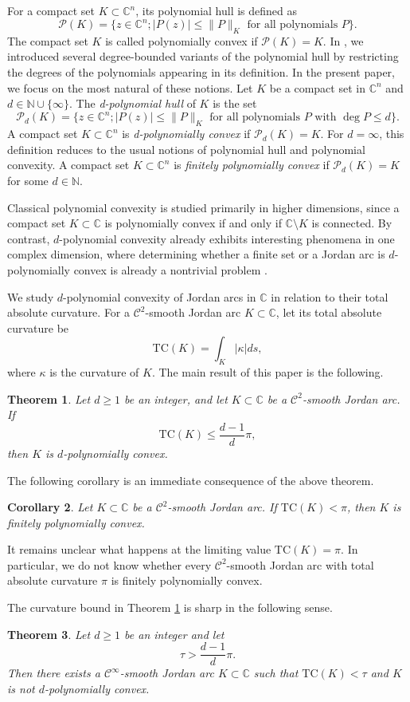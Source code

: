 \documentclass[reqno]{amsart}
\newtheorem{theorem}{Theorem}[section]
\newtheorem{corollary}[theorem]{Corollary}
\theoremstyle{definition}
\newcommand{\C}{\mathbb{C}}
\newcommand{\N}{\mathbb{N}}
\newcommand{\T}{\mathrm{TC}}
\newcommand{\cC}{\mathcal{C}}
\newcommand{\cP}{\mathcal{P}}
\numberwithin{equation}{section}
\begin{document}
\noindent For a compact set $K\subset \C^n$, its polynomial hull is defined as 
\[\cP(K)=\{z\in\C^n; |P(z)|\le \|P\|_K \text{ for all polynomials }P\}.\] 
The compact set $K$ is called polynomially convex if $\cP(K)=K$. In \cite{S}, we introduced several degree-bounded variants of the polynomial hull by restricting the degrees of the polynomials appearing in its definition. In the present paper, we focus on the most natural of these notions. Let $K$ be a compact set in $\C^n$ and $d\in\N\cup\{\infty\}$. The \textit{d-polynomial hull} of $K$ is the set \[\cP_d(K)=\{z\in\C^n; |P(z)|\le \|P\|_K \text{ for all polynomials }P \text{ with }\deg P\le d\}.\] 
A compact set $K\subset\C^n$ is \textit{d-polynomially convex} if $\cP_d(K)=K$. For $d=\infty$, this definition reduces to the usual notions of polynomial hull and polynomial convexity. A compact set $K\subset\C^n$ is  \textit{ finitely polynomially convex} if $\cP_d(K)=K$ for some $d\in\N$. 

Classical polynomial convexity is studied primarily in higher dimensions, since a compact set $K\subset\C$ is polynomially convex if and only if $\C\setminus K$ is connected. By contrast, $d$-polynomial convexity already exhibits interesting phenomena in one complex dimension, where determining whether a finite set or a Jordan arc is $d$-polynomially convex is already a nontrivial problem \cite{S}. 

We study $d$-polynomial convexity of Jordan arcs in $\mathbb C$
in relation to their total absolute curvature. For a $\cC^2$-smooth Jordan arc $K\subset\C$, let its total absolute curvature be \[\T(K)=\int_K|\kappa|ds,\]
where $\kappa$ is the curvature of $K$. The main result of this paper is the following.
\begin{theorem} \label{T1} Let $d\geq 1$ be an integer, and let $K\subset\C$ be a $\cC^2$-smooth Jordan arc. If \[\T(K)\le\frac{d-1}{d}\pi,\]  
then $K$ is $d$-polynomially convex.   
\end{theorem}
The following corollary is an immediate consequence of the above theorem. 
\begin{corollary} Let $K\subset\C$ be a $\cC^2$-smooth Jordan arc. If $\T(K)<\pi$, then $K$ is finitely polynomially convex.  	
\end{corollary}
It remains unclear what happens at the limiting value $\T(K)=\pi$.
In particular, we do not know whether every $\cC^2$-smooth Jordan arc
with total absolute curvature $\pi$ is finitely polynomially convex.

The curvature bound in Theorem \ref{T1} is sharp in the following sense.
\begin{theorem} \label{T2} 
Let $d\ge 1$ be an integer and let
\[\tau>\frac{d-1}{d}\pi.\]
Then there exists a $\cC^{\infty}$-smooth Jordan arc $K\subset\C$ such that $\T(K)<\tau$ and $K$ is not $d$-polynomially convex.
\end{theorem}
\end{document}
